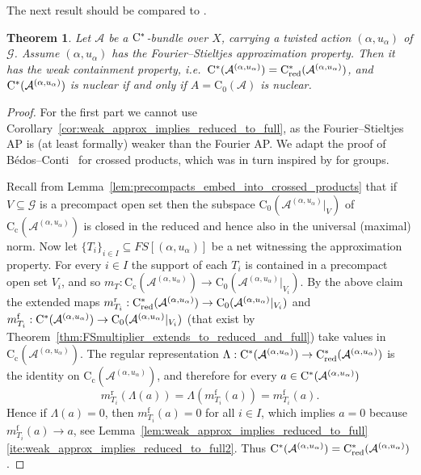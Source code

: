 \documentclass[11 pt, leqno]{amsart}
\numberwithin{equation}{section}
\theoremstyle{plain}
\newtheorem{thm}{Theorem}[section]
\theoremstyle{definition}
\newcommand*{\contc}{\mathrm{C_c}}%
\newcommand*{\contz}{\mathrm{C_0}}%
\DeclareMathOperator{\red}{red}%
\DeclareMathOperator{\rd}{r}%
\DeclareMathOperator{\f}{f}%
\newcommand{\m}{m}
\newcommand{\G}{\mathcal G} %
\newcommand{\A}{\mathcal A}
\newcommand{\cst}{\ifmmode\mathrm{C}^*\else{$\mathrm{C}^*$}\fi}
\begin{document}
The next result should be compared to \cite[Theorem 5.8]{BedosContiregular}.

\begin{thm}\label{thm:approximation_prop_implies_weak_containment}
Let $\A$ be a $\cst$-bundle over $X$, carrying a twisted action $(\alpha,u_\alpha)$ of $\G$. 
Assume $(\alpha,u_{\alpha})$ has the Fourier--Stieltjes approximation property. 
Then it has the weak containment property, i.e.\ $\cst(\A^{(\alpha,u_{\alpha})}) = \cst_{\red}(\A^{(\alpha,u_{\alpha})})$, and $\cst(\A^{(\alpha,u_{\alpha})})$ is nuclear if and only if $A = \contz(\A)$ is nuclear.
\end{thm}
\begin{proof}
For the first part we cannot use Corollary~\ref{cor:weak_approx_implies_reduced_to_full}, as the Fourier--Stieltjes AP is (at least formally) weaker than the Fourier AP. 
We adapt the proof of B\'{e}dos--Conti~\cite[Theorem 4.6]{BedosConti2} for crossed products, which was in turn inspired by \cite[Theorem 2.6]{BO} for groups.

Recall from Lemma~\ref{lem:precompacts_embed_into_crossed_products} that if $V\subseteq \G$ is a precompact open set then the subspace $\contz(\A^{(\alpha,u_{\alpha})}|_{V})$ of $\contc(\A^{(\alpha,u_{\alpha})})$ is closed in the reduced and hence also in the universal (maximal) norm. 
Now let $\{T_{i}\}_{i\in I} \subseteq FS[(\alpha,u_{\alpha})]$  be a net witnessing the approximation property. 
For every $i \in I$ the support of each $T_i$ is contained in a precompact open set $V_i$, and so $\m_{T} : \contc(\A^{(\alpha,u_{\alpha})})\to \contz(\A^{(\alpha,u_{\alpha})}|_{V_i})$. 
By the above claim the extended maps $\m_{T_i}^{\rd} : \cst_{\red}(\A^{(\alpha,u_{\alpha})}) \to \contz( \A^{(\alpha,u_{\alpha})}|_{V_i} )$ and $\m_{T_i}^{\f} : \cst(\A^{(\alpha,u_{\alpha})}) \to \contz( \A^{(\alpha,u_{\alpha})}|_{V_i})$ (that exist by Theorem~\ref{thm:FSmultiplier_extends_to_reduced_and_full}) take values in $\contc(\A^{(\alpha,u_{\alpha})})$. 
The regular representation $\Lambda : \cst(\A^{(\alpha,u_{\alpha})}) \to \cst_{\red}(\A^{(\alpha,u_{\alpha})})$ is the identity on $\contc(\A^{(\alpha,u_{\alpha})})$, and therefore for every $a \in \cst(\A^{(\alpha,u_{\alpha})})$ 
\[
    \m_{T_i}^{\rd} (\Lambda(a)) = \Lambda ( \m_{T_i}^{\f}(a)) = \m_{T_i}^{\f}(a) .
\]
Hence if $\Lambda(a) = 0$, then $\m_{T_i}^{\f}(a) = 0$ for all $i\in I$, which implies $a=0$ because $\m_{T_i}^{\f}(a)\to a$, see Lemma~\ref{lem:weak_approx_implies_reduced_to_full}\ref{ite:weak_approx_implies_reduced_to_full2}. 
Thus $\cst(\A^{(\alpha,u_{\alpha})}) = \cst_{\red}(\A^{(\alpha,u_{\alpha})})$.


\end{proof}
\end{document}
